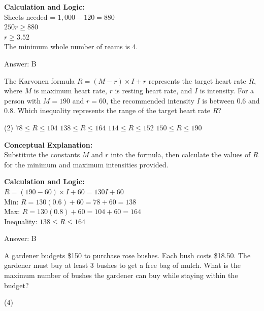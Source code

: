 \documentclass[11pt,paper=a4,answers]{exam}
\begin{document}
\begin{questions}
\begin{solution}
\vspace{10pt}
\textbf{Calculation and Logic:} \\
Sheets needed = $1,000 - 120 = 880$ \\
$250r \ge 880$ \\
$r \ge 3.52$ \\
The minimum whole number of reams is 4.

\vspace{15pt}
Answer: \colorbox{yellow!100}{B}
\end{solution}

\vspace{20pt}

\question
The Karvonen formula $R = (M - r) \times I + r$ represents the target heart rate $R$, where $M$ is maximum heart rate, $r$ is resting heart rate, and $I$ is intensity. For a person with $M = 190$ and $r = 60$, the recommended intensity $I$ is between $0.6$ and $0.8$. Which inequality represents the range of the target heart rate $R$?
\begin{tasks}(2)
    \task $78 \le R \le 104$
    \task $138 \le R \le 164$
    \task $114 \le R \le 152$
    \task $150 \le R \le 190$
\end{tasks}

\begin{solution}
\textbf{Conceptual Explanation:} \\
Substitute the constants $M$ and $r$ into the formula, then calculate the values of $R$ for the minimum and maximum intensities provided.

\vspace{10pt}
\textbf{Calculation and Logic:} \\
$R = (190 - 60) \times I + 60 = 130I + 60$ \\
Min: $R = 130(0.6) + 60 = 78 + 60 = 138$ \\
Max: $R = 130(0.8) + 60 = 104 + 60 = 164$ \\
Inequality: $138 \le R \le 164$

\vspace{15pt}
Answer: \colorbox{yellow!100}{B}
\end{solution}

\vspace{20pt}

\question
A gardener budgets \$150 to purchase rose bushes. Each bush costs \$18.50. The gardener must buy at least 3 bushes to get a free bag of mulch. What is the maximum number of bushes the gardener can buy while staying within the budget?
\begin{tasks}(4)
\end{tasks}


\end{questions}
\end{document}
